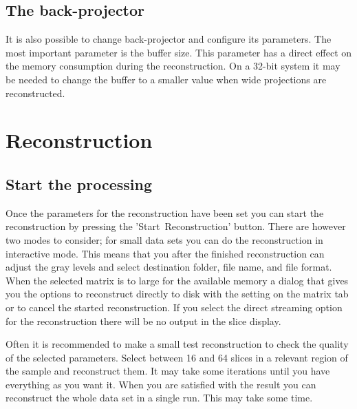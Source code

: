\documentclass[a4paper]{scrreprt}
\begin{document}
\subsection{The back-projector}
It is also possible to change back-projector and configure its parameters.
The most important parameter is the buffer size. This parameter has a direct
effect on the memory consumption during the reconstruction. On a 32-bit system
it may be needed to change the buffer to a smaller value when wide projections
are reconstructed.

\section{Reconstruction}

\subsection{Start the processing}
Once the parameters for the reconstruction have been set you can start the
reconstruction by pressing the 'Start~Reconstruction' button. There are however
two modes to consider; for small data sets you can do the reconstruction in
interactive mode. This means that you after the finished reconstruction can
adjust the gray levels and select destination folder, file name, and file
format. When the selected matrix is to large for the available memory a dialog
that gives you the options to reconstruct directly to disk with the setting on
the matrix tab or to cancel the started reconstruction. If you select the
direct streaming option for the reconstruction there will be no
output in the slice display.

Often it is recommended to make a small test reconstruction to check the quality
of the selected parameters. Select between 16 and 64 slices in a relevant region
of the sample and reconstruct them. It may take some iterations until you have
everything as you want it. When you are satisfied with the result you can
reconstruct the whole data set in a single run. This may take some time.
\end{document}
